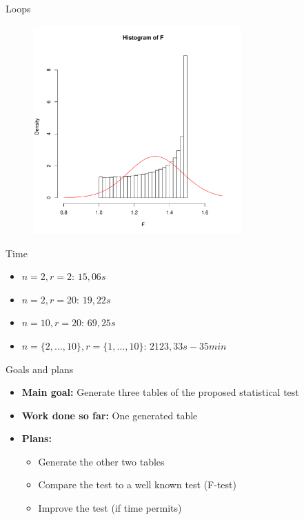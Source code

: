 \documentclass{beamer}
\begin{document}
\begin{frame}{Loops}
\begin{figure}
\begin{overprint}
\centerline{\includegraphics[width=8cm]{Primer_1e+6.pdf}}
\end{overprint}
\end{figure}

\end{frame}

\begin{frame}{Time}
\begin{itemize}
\item $n=2, r=2$: $15,06s$
\item $n=2, r=20$: $19,22s$
\item $n=10,r=20$: $69,25s$
\item $n=\{2,\dots,10\},  r=\{1, \dots,10\}$: $2123,33s -35min$
\end{itemize}
\end{frame}

\begin{frame}{Goals and plans}
\begin{itemize}
\item \textbf{Main goal:} Generate three tables of the proposed statistical test
\item \textbf{Work done so far:} One generated table
\item \textbf{Plans:} 
\begin{itemize}
\item Generate the other two tables
\item Compare the test to a well known test (F-test)
\item Improve the test (if time permits)
\end{itemize}
\end{itemize}
\end{frame}
\end{document}
